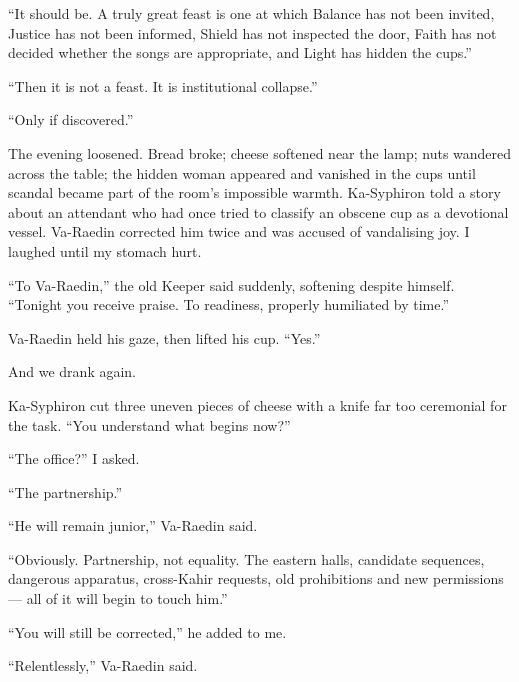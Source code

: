 ``It should be. A truly great feast is one at which Balance has not been invited, Justice has not been informed, Shield has not inspected the door, Faith has not decided whether the songs are appropriate, and Light has hidden the cups.''\par

``Then it is not a feast. It is institutional collapse.''\par

``Only if discovered.''\par

The evening loosened.
Bread broke; cheese softened near the lamp; nuts wandered across the table; the hidden woman appeared and vanished in the cups until scandal became part of the room's impossible warmth.
Ka-Syphiron told a story about an attendant who had once tried to classify an obscene cup as a devotional vessel. Va-Raedin corrected him twice and was accused of vandalising joy. I laughed until my stomach hurt.\par

``To Va-Raedin,'' the old Keeper said suddenly, softening despite himself. ``Tonight you receive praise. To readiness, properly humiliated by time.''\par

Va-Raedin held his gaze, then lifted his cup. ``Yes.''\par

And we drank again.\par

Ka-Syphiron cut three uneven pieces of cheese with a knife far too ceremonial for the task. ``You understand what begins now?''\par

``The office?'' I asked.\par

``The partnership.''\par

``He will remain junior,'' Va-Raedin said.\par

``Obviously. Partnership, not equality. The eastern halls, candidate sequences, dangerous apparatus, cross-Kahir requests, old prohibitions and new permissions --- all of it will begin to touch him.''\par

``You will still be corrected,'' he added to me.\par

``Relentlessly,'' Va-Raedin said.\par

